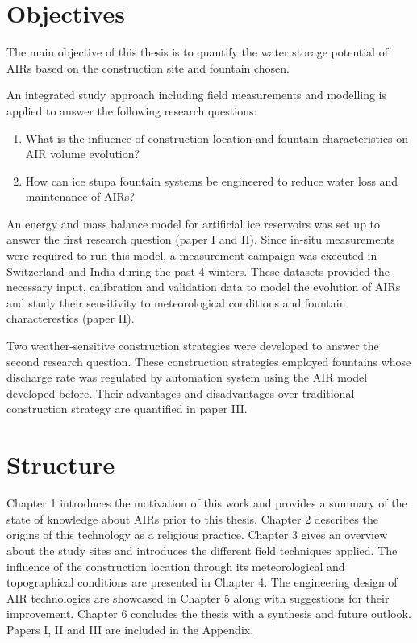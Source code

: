 \section{Objectives}

The main objective of this thesis is to quantify the water storage potential of AIRs based on the construction
site and fountain chosen. 

An integrated study approach including field measurements and modelling is applied to answer the following
research questions: 

\begin{enumerate}

\item What is the influence of construction location and fountain characteristics on AIR volume evolution? 

\item How can ice stupa fountain systems be engineered to reduce water loss and maintenance of AIRs?

\end{enumerate}

An energy and mass balance model for artificial ice reservoirs was set up to answer the first research question
(paper I and II). Since in-situ measurements were required to run this model, a measurement campaign was
executed in Switzerland and India during the past 4 winters. These datasets provided the necessary input,
calibration and validation data to model the evolution of AIRs and study their sensitivity to meteorological
conditions and fountain characterestics (paper II). 

Two weather-sensitive construction strategies were developed to answer the second research question. These
construction strategies employed fountains whose discharge rate was regulated by automation system using the AIR
model developed before. Their advantages and disadvantages over traditional construction strategy are quantified
in paper III.

\section{Structure}

Chapter 1 introduces the motivation of this work and provides a summary of the state of knowledge about AIRs
prior to this thesis. Chapter 2 describes the origins of this technology as a religious practice. Chapter 3
gives an overview about the study sites and introduces the different field techniques applied. The influence of
the construction location through its meteorological and topographical conditions are presented in Chapter 4.
The engineering design of AIR technologies are showcased in Chapter 5 along with suggestions for their
improvement. Chapter 6 concludes the thesis with a synthesis and future outlook. Papers I, II and III are
included in the Appendix.


